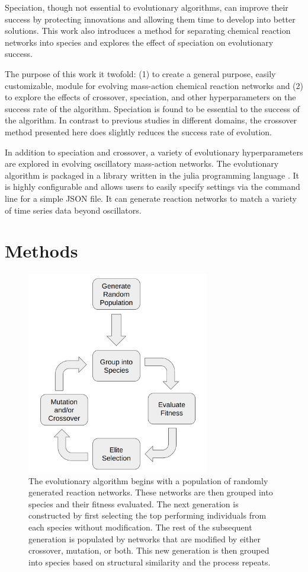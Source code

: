 \documentclass[12pt]{report}
\begin{document}
Speciation, though not essential to evolutionary algorithms, can improve their success by protecting innovations and allowing them time to develop into better solutions. This work also introduces a method for separating chemical reaction networks into species and explores the effect of speciation on evolutionary success.

The purpose of this work it twofold: (1) to create a general purpose, easily customizable, module for evolving mass-action chemical reaction networks and (2) to explore the effects of crossover, speciation, and other hyperparameters on the success rate of the algorithm. Speciation is found to be essential to the success of the algorithm. In contrast to previous studies in different domains, the crossover method presented here does slightly reduces the success rate of evolution. 

In addition to speciation and crossover, a variety of evolutionary hyperparameters are explored in evolving oscillatory mass-action networks. The evolutionary algorithm is packaged in a library written in the julia programming language \cite{bezanson2017julia}. It is highly configurable and allows users to easily specify settings via the command line for a simple JSON file. It can generate reaction networks to match a variety of time series data beyond oscillators.



\section{Methods}

\begin{figure}
\centering
    \includegraphics[width=8cm]{images/algo_description_crossover.png}
    \caption[Overview of the evolution algorithm with speciation]{The evolutionary algorithm begins with a population of randomly generated reaction networks. These networks are then grouped into species and their fitness evaluated. The next generation is constructed by first selecting the top performing individuals from each species without modification. The rest of the subsequent generation is populated by networks that are modified by either crossover, mutation, or both. This new generation is then grouped into species based on structural similarity and the process repeats.}
    \label{fig:algo_description_crossover}
\end{figure}
\end{document}
